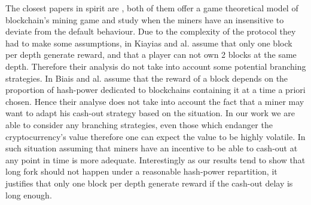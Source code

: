 
\smallskip
{} 
The closest papers in spirit are \cite{mininggames:2016,biais2018blockchain}, both of them offer a game theoretical model of blockchain's mining game and study when the miners have an insensitive to deviate from the default behaviour. Due to the complexity of the protocol they had to make some assumptions, in \cite{mininggames:2016} Kiayias and al. assume that only one block per depth generate reward, and that a player can not own 2 blocks at the same depth. Therefore their analysis do not take into account some potential branching strategies. In \cite{biais2018blockchain} Biais and al. assume that the reward of a block depends on the proportion of hash-power dedicated to blockchains containing it at a time a priori chosen. Hence their analyse does not take into account the fact that a miner may want to adapt his cash-out strategy based on the situation. 
In our work we are able to consider any branching strategies, even those which endanger the cryptocurrency's value therefore one can expect the value to be highly volatile. In such situation assuming that miners have an incentive to be able to cash-out at any point in time is more adequate. Interestingly as our results tend to show that long fork should not happen under a reasonable hash-power repartition, it justifies that only one block per depth generate reward if the cash-out delay is long enough.

